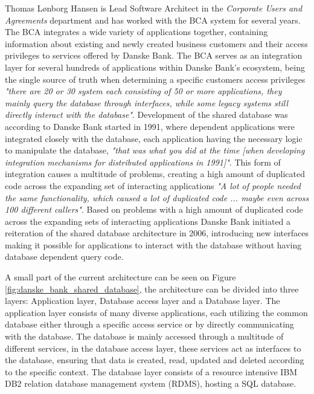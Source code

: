 Thomas Lønborg Hansen is Lead Software Architect in the \textit{Corporate Users and Agreements} department and has worked with the BCA system for several years. The BCA integrates a wide variety of applications together, containing information about existing and newly created business customers and their access privileges to services offered by Danske Bank. The BCA serves as an integration layer for several hundreds of applications within Danske Bank's ecosystem, being the single source of truth when determining a specific customers access privileges \textit{"there are 20 or 30 system each consisting of 50 or more applications, they mainly query the database through interfaces, while some legacy systems still directly interact with the database"}. Development of the shared database was according to Danske Bank started in 1991, where dependent applications were integrated closely with the database, each application having the necessary logic to manipulate the database, \textit{"that was what you did at the time [when developing integration mechanisms for distributed applications in 1991]"}. This form of integration causes a multitude of problems, creating a high amount of duplicated code across the expanding set of interacting applications \textit{"A lot of people needed the same functionality, which caused a lot of duplicated code ... maybe even across 100 different callers"}. Based on problems with a high amount of duplicated code across the expanding sets of interacting applications Danske Bank initiated a reiteration of the shared database architecture in 2006, introducing new interfaces making it possible for applications to interact with the database without having database dependent query code.

A small part of the current architecture can be seen on Figure \ref{fig:danske_bank_shared_database}, the architecture can be divided into three layers: Application layer, Database access layer and a Database layer. The application layer consists of many diverse applications, each utilizing the common database either through a specific access service or by directly communicating with the database. The database is mainly accessed through a multitude of different services, in the database access layer, these services act as interfaces to the database, ensuring that data is created, read, updated and deleted according to the specific context. The database layer consists of a resource intensive IBM DB2 relation database management system (RDMS), hosting a SQL database. 


